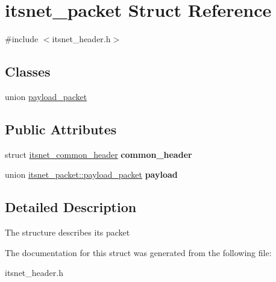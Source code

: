 \hypertarget{structitsnet__packet}{\section{itsnet\-\_\-packet \-Struct \-Reference}
\label{structitsnet__packet}
}


{\ttfamily \#include $<$itsnet\-\_\-header.\-h$>$}

\subsection*{\-Classes}
\begin{DoxyCompactItemize}
\item 
union \hyperlink{unionitsnet__packet_1_1payload__packet}{payload\-\_\-packet}
\end{DoxyCompactItemize}
\subsection*{\-Public \-Attributes}
\begin{DoxyCompactItemize}
\item 
\hypertarget{structitsnet__packet_a6e62091cb573d4f1785d055b4ab89aa2}{struct \hyperlink{structitsnet__common__header}{itsnet\-\_\-common\-\_\-header} {\bfseries common\-\_\-header}}\label{structitsnet__packet_a6e62091cb573d4f1785d055b4ab89aa2}

\item 
\hypertarget{structitsnet__packet_a15f97e3805b5a830e4533f2276c8b162}{union \hyperlink{unionitsnet__packet_1_1payload__packet}{itsnet\-\_\-packet\-::payload\-\_\-packet} {\bfseries payload}}\label{structitsnet__packet_a15f97e3805b5a830e4533f2276c8b162}

\end{DoxyCompactItemize}


\subsection{\-Detailed \-Description}
\-The structure describes its packet 

\-The documentation for this struct was generated from the following file\-:\begin{DoxyCompactItemize}
\item 
itsnet\-\_\-header.\-h\end{DoxyCompactItemize}
